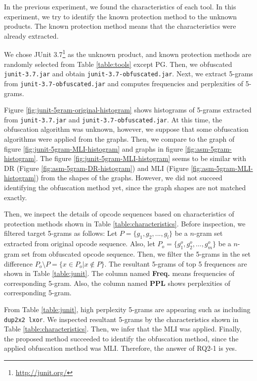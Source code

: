 \documentclass[conference]{IEEEtran}
\begin{document}
In the previous experiment, we found the characteristics of each tool.
In this experiment, we try to identify the known protection method to
the unknown products.  The known protection method means that the
characteristics were already extracted.

We chose JUnit 3.7\footnote[5]{\url{http://junit.org/}} as the unknown
product, and known protection methods are randomly selected from Table
\ref{table:tools} except PG.  Then, we obfuscated \texttt{
  junit-3.7.jar} and obtain \texttt{junit-3.7-obfuscated.jar}.
Next, we extract 5-grams from \texttt{junit-3.7-obfuscated.jar} and
computes frequencies and perplexities of 5-grams.

Figure \ref{fig:junit-5gram-original-histogram} shows histograms of
5-grams extracted from \texttt{junit-3.7.jar} and
\texttt{junit-3.7-obfuscated.jar}.  At this time, the obfuscation
algorithm was unknown, however, we suppose that some obfuscation
algorithms were applied from the graphs.  Then, we compare to the
graph of figure \ref{fig:junit-5gram-MLI-histogram} and graphs in
figure \ref{fig:asm-5gram-histogram}.  The figure
\ref{fig:junit-5gram-MLI-histogram} seems to be similar with DR
(Figure \ref{fig:asm-5gram-DR-histogram}) and MLI (Figure
\ref{fig:asm-5gram-MLI-histogram}) from the shapes of the graphs.
However, we did not succeed identifying the obfuscation method yet,
since the graph shapes are not matched exactly.

Then, we inspect the details of opcode sequences based on
characteristics of protection methods shown in Table
\ref{table:characteristics}.  Before inspection, we filtered target
5-grams as follows:
%
Let $P=\{ g_1, g_2, ..., g_l \}$ be a $n$-gram set extracted from
original opcode sequence.  Also, let $P_o=\{ g^o_1, g^o_2, ..., g^o_m
\}$ be a $n$-gram set from obfuscated opcode sequence.  Then, we
filter the 5-grams in the set difference $P_o \setminus P = \{ x
\in P_o | x \not\in P \}$.  The resultant 5-grams of top 5 frequences
are shown in Table \ref{table:junit}.  The column named \textbf{Freq.}
means frequencies of corresponding 5-gram.  Also, the column named
\textbf{PPL} shows perplexities of corresponding 5-gram.

From Table \ref{table:junit}, high perplexity 5-grams are appearing
such as including \texttt{dup2x2 lxor}.  We inspected resultant
5-grams by the characteristics shown in Table
\ref{table:characteristics}.  Then, we infer that the MLI was applied.
Finally, the proposed method succeeded to identify the obfuscation
method, since the applied obfuscation method was MLI.  Therefore, the
answer of RQ2-1 is yes.
\end{document}
